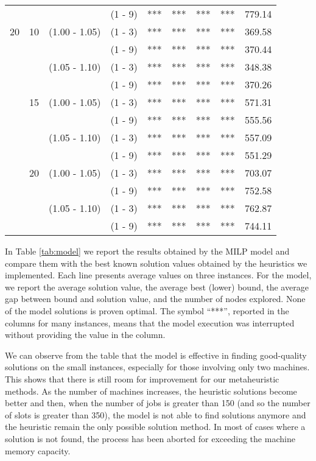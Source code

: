 \documentclass[a4paper,11pt]{article}
\begin{document}
\begin{table}[h!]
\begin{tabular}{ccccccccc}
   &    &  & (1 - 9) & 							*** &*** &*** &*** &  779.14 \\
20 & 10 & (1.00 - 1.05) & (1 - 3) & 			*** &*** &*** &*** &  369.58 \\
   &    &  & (1 - 9) & 							*** &*** &*** &*** &  370.44 \\
   &    & (1.05 - 1.10) & (1 - 3) & 			*** &*** &*** &*** &  348.38 \\
   &    &  & (1 - 9) &						    *** &*** &*** &*** &  370.26 \\
   & 15 & (1.00 - 1.05) & (1 - 3) & 			*** &*** &*** &*** &  571.31 \\
   &    &  & (1 - 9) & 							*** &*** &*** &*** &  555.56 \\
   &    & (1.05 - 1.10) & (1 - 3) & 			*** &*** &*** &*** &  557.09 \\
   &    &  & (1 - 9) & 							*** &*** &*** &*** &  551.29 \\
   & 20 & (1.00 - 1.05) & (1 - 3) & 			*** &*** &*** &*** &  703.07 \\
   &    &  & (1 - 9) & 							*** &*** &*** &*** & 752.58 \\
   &    & (1.05 - 1.10) & (1 - 3) & 			*** &*** &*** &*** & 762.87 \\
   &    &  & (1 - 9) & 			***			 & *** &*** & *** & 744.11 \\
\bottomrule
\end{tabular}
\end{table} 

In Table \ref{tab:model} we report the results obtained by the MILP model and compare them with the best known solution values obtained by the heuristics we implemented. 
Each line presents average values on three instances. For the model, we report the average solution value, the average best (lower) bound, the average gap between bound and solution value, and the number of nodes explored. None of the model solutions is proven optimal. The symbol ``***'', reported in the columns for many instances, means that the model execution was interrupted without providing the value in the column. 

We can observe from the table that the model is effective in finding good-quality solutions on the small instances, especially for those involving only two machines. This shows that there is still room for improvement for our metaheuristic methods.  As the number of machines increases, the heuristic solutions become better and then, when the number of jobs is greater than 150 (and so the number of slots is greater than 350), the model is not able to find solutions anymore and the heuristic remain the only possible solution method. In most of cases where a solution is not found, the process has been aborted for exceeding the machine memory capacity. 
\end{document}
